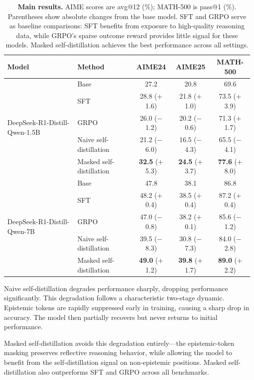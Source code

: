 \documentclass[11pt]{article}
\begin{document}
\begin{table}[t!]
\centering
\small
\begin{tabular}{llccc}
\toprule
\textbf{Model} & \textbf{Method} & \textbf{AIME24} & \textbf{AIME25} & \textbf{MATH-500} \\
\midrule
\multirow{5}{*}{DeepSeek-R1-Distill-Qwen-1.5B}
& Base & 27.2 & 20.8 & 69.6 \\
& SFT & 28.8 ($+$1.6) & 21.8 ($+$1.0) & 73.5 ($+$3.9) \\
& GRPO & 26.0 ($-$1.2) & 20.2 ($-$0.6) & 71.3 ($+$1.7) \\
& Naive self-distillation & 21.2 ($-$6.0) & 16.5 ($-$4.3) & 65.5 ($-$4.1) \\
& Masked self-distillation & \textbf{32.5} ($+$5.3) & \textbf{24.5} ($+$3.7) & \textbf{77.6} ($+$8.0) \\
\midrule
\multirow{5}{*}{DeepSeek-R1-Distill-Qwen-7B}
& Base & 47.8 & 38.1 & 86.8 \\
& SFT & 48.2 ($+$0.4) & 38.5 ($+$0.4) & 87.2 ($+$0.4) \\
& GRPO & 47.0 ($-$0.8) & 38.2 ($+$0.1) & 85.6 ($-$1.2) \\
& Naive self-distillation & 39.5 ($-$8.3) & 30.8 ($-$7.3) & 84.0 ($-$2.8) \\
& Masked self-distillation & \textbf{49.0} ($+$1.2) & \textbf{39.8} ($+$1.7) & \textbf{89.0} ($+$2.2) \\
\bottomrule
\end{tabular}
\caption{\textbf{Main results.} AIME scores are avg@12 (\%); MATH-500 is pass@1 (\%). Parentheses show absolute changes from the base model. SFT and GRPO serve as baseline comparisons: SFT benefits from exposure to high-quality reasoning data, while GRPO's sparse outcome reward provides little signal for these models. Masked self-distillation achieves the best performance across all settings.}
\label{tab:cot_results}
\end{table}

Naive self-distillation degrades performance sharply, dropping performance significantly. This degradation follows a characteristic two-stage dynamic. Epistemic tokens are rapidly suppressed early in training, causing a sharp drop in accuracy. The model then partially recovers but never returns to initial performance. 

Masked self-distillation avoids this degradation entirely---the epistemic-token masking preserves reflective reasoning behavior, while allowing the model to benefit from the self-distillation signal on non-epistemic positions. Masked self-distillation also outperforms SFT and GRPO across all benchmarks.
\end{document}
